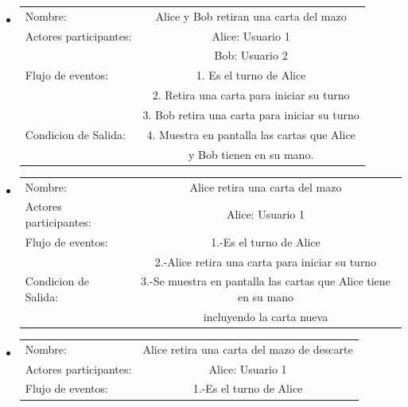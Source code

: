 \begin{itemize}
\item
    \begin{tabular}{ l | c  }
        Nombre:                      & Alice y Bob retiran una carta del mazo \\
        Actores participantes:          & Alice: Usuario  1                                              \\\hline
                                        & Bob: Usuario    2                                                 \\\hline
        Flujo de eventos:               & 1. Es el turno de Alice                                      \\
                                        & 2. Retira una carta para iniciar su turno \\
                                        & 3. Bob retira una carta para iniciar su turno \\\hline
        Condicion de Salida:            & 4. Muestra en pantalla las cartas que Alice \\ & y 
        Bob tienen en su mano.\\
    \end{tabular}
\item
    \begin{tabular}{ l | c  }
        Nombre:            & Alice retira una carta del mazo \\
        Actores participantes: & Alice: Usuario  1                                              \\\hline
        Flujo de eventos:               & 1.-Es el turno de Alice                                     \\
                                        & 2.-Alice retira una carta para iniciar su turno \\\hline
        Condicion de Salida:            & 3.-Se muestra en pantalla las cartas que Alice tiene en su mano \\
                                        &incluyendo la carta nueva         \\
    \end{tabular}
\item
    \begin{tabular}{ l | c  }
        Nombre:                      & Alice retira una carta del mazo de descarte \\
        Actores participantes:          & Alice: Usuario  1                                              \\\hline
        Flujo de eventos:               & 1.-Es el turno de Alice \\

\end{tabular}
\end{itemize}
